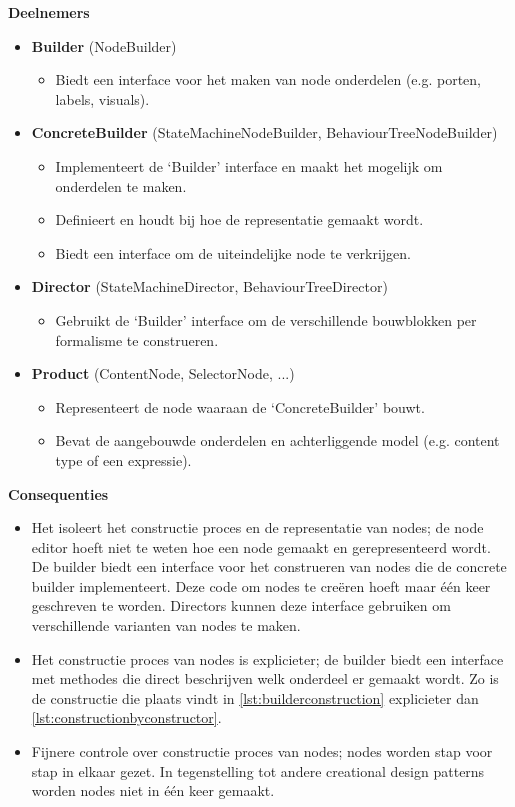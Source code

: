 \noindent\textbf{Deelnemers}
\begin{itemize}
    \item \textbf{Builder} (NodeBuilder)
    \begin{itemize}
        \item Biedt een interface voor het maken van node onderdelen (e.g. porten, labels, visuals).
    \end{itemize}

    \item \textbf{ConcreteBuilder} (StateMachineNodeBuilder, BehaviourTreeNodeBuilder)
    \begin{itemize}
        \item Implementeert de ‘Builder’ interface en maakt het mogelijk om onderdelen te maken.
        \item Definieert en houdt bij hoe de representatie gemaakt wordt. 
        \item Biedt een interface om de uiteindelijke node te verkrijgen.

    \end{itemize}

    \item \textbf{Director} (StateMachineDirector, BehaviourTreeDirector)
    \begin{itemize}
        \item Gebruikt de ‘Builder’ interface om de verschillende bouwblokken per formalisme te construeren.
    \end{itemize}
    \item \textbf{Product} (ContentNode, SelectorNode, ...)
    \begin{itemize}
        \item Representeert de node waaraan de ‘ConcreteBuilder’ bouwt.
        \item Bevat de aangebouwde onderdelen en achterliggende model (e.g. content type of een expressie).
    \end{itemize}
\end{itemize}

\noindent\textbf{Consequenties}
\begin{itemize}
    \item Het isoleert het constructie proces en de representatie van nodes; de node editor hoeft niet te weten hoe een node gemaakt en gerepresenteerd wordt. De builder biedt een interface voor het construeren van nodes die de concrete builder implementeert. Deze code om nodes te creëren hoeft maar één keer geschreven te worden. Directors kunnen deze interface gebruiken om verschillende varianten van nodes te maken.
    \item Het constructie proces van nodes is explicieter; de builder biedt een interface met methodes die direct beschrijven welk onderdeel er gemaakt wordt. Zo is de constructie die plaats vindt in \autoref{lst:builderconstruction} explicieter dan \autoref{lst:constructionbyconstructor}.
    \item Fijnere controle over constructie proces van nodes; nodes worden stap voor stap in elkaar gezet. In tegenstelling tot andere creational design patterns worden nodes niet in één keer gemaakt.
\end{itemize}

